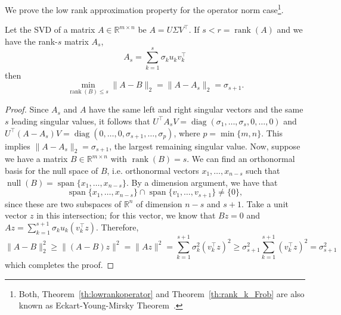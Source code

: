 We prove the low rank approximation property for the operator norm case\footnote{Both, Theorem~\ref{th:lowrankoperator} and Theorem~\ref{th:rank_k_Frob} are also known as Eckart-Young-Mirsky Theorem~\cite{Golub_MatrixComputations}.}.
\begin{theorem}\label{th:lowrankoperator}
Let the SVD of a matrix $A\in \mathbb{R}^{m\times n}$ be $A = U \Sigma V^\top  $. If $s < r = \operatorname{rank}(A)$ and we have the rank-$s$ matrix $A_s$,
$$A_s = \sum_{k=1}^s \sigma_k u_kv_k^\top  $$
then
$$\min_{\operatorname{rank}(B) \leq s} \|A - B \|_2 = \|A - A_s \|_2 =  \sigma_{s+1}.$$
\end{theorem}
\begin{proof}
Since $A_s$ and $A$ have the same left and right singular vectors and the same $s$ leading singular values, it follows that $U^\top   A_s V = \operatorname{diag}(\sigma_1,\ldots,\sigma_s,0,\ldots,0)$ and $U^\top   (A - A_s) V = \operatorname{diag}(0,\ldots,0,\sigma_{s+1},\ldots,\sigma_p)$, where $p=\min\{m,n\}$. This implies $\|A-A_s\|_2 = \sigma_{s+1}$, the largest remaining singular value.
Now, suppose we have a matrix $B \in \mathbb{R}^{m\times n}$ with $\operatorname{rank}(B) = s$. We can find an orthonormal
basis for the null space of $B$, i.e. orthonormal vectors $x_1, \ldots, x_{n-s}$ such that $\operatorname{null}(B) =
\operatorname{span}\{x_1,\ldots,x_{n-s}\}$. By a dimension argument, we have that
$$\operatorname{span}\{x_1,\ldots,x_{n-s}\}\cap \operatorname{span}\{v_1,\ldots,v_{s+1}\} \neq \{0 \},$$
since these are two subspaces of $\mathbb{R}^n$ of dimension $n-s$ and $s+1$. Take a unit vector $z$ in this intersection; for this vector, we know that $Bz = 0$ and $Az = \sum_{k=1}^{s+1} \sigma_k u_k (v_k^\top   z)$. Therefore,
$$\|A-B\|_2^2 \geq \|(A-B)z\|^2 = \|Az\|^2 =  \sum_{k=1}^{s+1} \sigma_k^2 (v_k^\top   z)^2 \geq \sigma_{s+1}^2 \sum_{k=1}^{s+1} (v_k^\top   z)^2 = \sigma_{s+1}^2$$
which completes the proof.
\end{proof}


